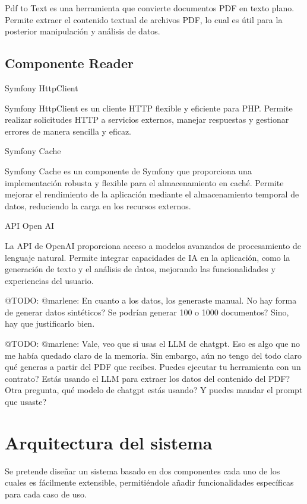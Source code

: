 Pdf to Text es una herramienta que convierte documentos PDF en texto plano.
Permite extraer el contenido textual de archivos PDF, lo cual es útil para la posterior manipulación y análisis de
datos.

\subsection*{Componente Reader}

Symfony HttpClient

Symfony HttpClient es un cliente HTTP flexible y eficiente para PHP. Permite realizar solicitudes HTTP a servicios
externos, manejar respuestas y gestionar errores de manera sencilla y eficaz.

Symfony Cache

Symfony Cache es un componente de Symfony que proporciona una implementación robusta y flexible para el almacenamiento
en caché.
Permite mejorar el rendimiento de la aplicación mediante el almacenamiento temporal de datos, reduciendo la carga en los
recursos externos.

API Open AI

La API de OpenAI proporciona acceso a modelos avanzados de procesamiento de lenguaje natural.
Permite integrar capacidades de IA en la aplicación, como la generación de texto y el análisis de datos, mejorando las
funcionalidades y experiencias del usuario.


\colorbox{color_highlight}{@TODO: @marlene:}
En cuanto a los datos, los generaste manual. No hay forma de generar datos sintéticos? Se podrían generar 100 o 1000 documentos? Sino, hay que justificarlo bien.

\colorbox{color_highlight}{@TODO: @marlene:}
Vale, veo que si usas el LLM de chatgpt. Eso es algo que no me había quedado claro de la memoria. Sin embargo, aún no tengo del todo claro qué generas a partir del PDF que recibes. Puedes ejecutar tu herramienta con un contrato? Estás usando el LLM para extraer los datos del contenido del PDF? Otra pregunta, qué modelo de chatgpt estás usando? Y puedes mandar el prompt que usaste?


\section{Arquitectura del sistema}
Se pretende diseñar un sistema basado en dos componentes cada uno de los cuales es fácilmente extensible, permitiéndole añadir funcionalidades específicas para cada caso de uso.

